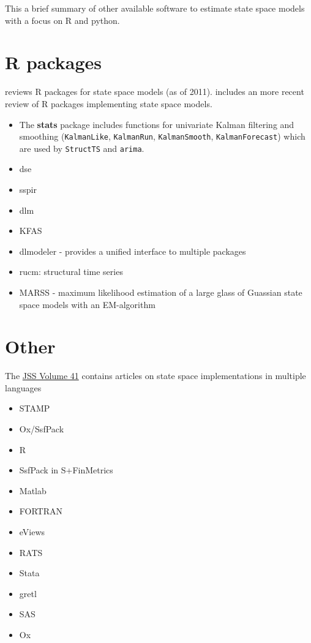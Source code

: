 \documentclass[]{book}
\providecommand{\tightlist}{%
  \setlength{\itemsep}{0pt}\setlength{\parskip}{0pt}}
\begin{document}
This a brief summary of other available software to estimate state space
models with a focus on R and python.

\section{R packages}\label{r-packages}

\textcite{Tusell2011} reviews R packages for state space models (as of
2011). \textcite{Helske2012} includes an more recent review of R
packages implementing state space models.

\begin{itemize}
\item
  The \textbf{stats} package includes functions for univariate Kalman
  filtering and smoothing (\texttt{KalmanLike}, \texttt{KalmanRun},
  \texttt{KalmanSmooth}, \texttt{KalmanForecast}) which are used by
  \texttt{StructTS} and \texttt{arima}.
\item
  dse
\item
  sspir
\item
  dlm
\item
  KFAS
\item
  dlmodeler - provides a unified interface to multiple packages
\item
  rucm: structural time series
\item
  MARSS - maximum likelihood estimation of a large glass of Guassian
  state space models with an EM-algorithm
\end{itemize}

\section{Other}\label{other}

The \href{https://www.jstatsoft.org/issue/view/v041}{JSS Volume 41}
\autocite{CommandeurKoopmanOoms2011} contains articles on state space
implementations in multiple languages

\begin{itemize}
\tightlist
\item
  STAMP \autocite{Mendelssohn2011a}
\item
  Ox/SsfPack \autocite{Pelagatti2011a}
\item
  R \autocite{PetrisPetrone2011a}
\item
  SsfPack in S+FinMetrics \autocite{Zivot2011a}
\item
  Matlab \autocite{PengAston2011a}
\item
  FORTRAN \autocite{Bell2011a}
\item
  eViews \autocite{Bossche2011a}
\item
  RATS \autocite{Doan2011a}
\item
  Stata \autocite{DrukkerGates2011a}
\item
  gretl \autocite{Lucchetti2011a}
\item
  SAS \autocite{Selukar2011a}
\item
  Ox \autocite{Bos2011a}
\end{itemize}
\end{document}
